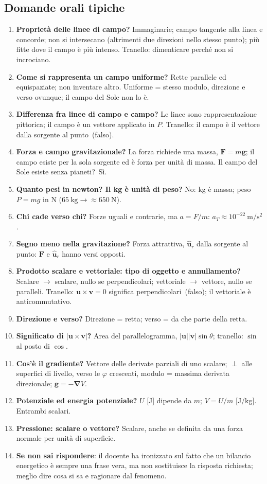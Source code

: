 \documentclass[11pt,a4paper]{article}
\newcommand{\vv}[1]{\mathbf{#1}}
\newcommand{\ur}{\hat{\mathbf{u}}_r}
\newcommand{\mo}[1]{\left|#1\right|}
\newcommand{\unit}[1]{\ \mathrm{#1}}
\newcommand{\nab}{\boldsymbol{\nabla}}
\begin{document}
\subsection{Domande orali tipiche}
\begin{enumerate}
\item \textbf{Proprietà delle linee di campo?} Immaginarie; campo tangente alla linea e concorde; non si intersecano (altrimenti due direzioni nello stesso punto); più fitte dove il campo è più intenso. Tranello: dimenticare perché non si incrociano.
\item \textbf{Come si rappresenta un campo uniforme?} Rette parallele ed equispaziate; non inventare altro. Uniforme = stesso modulo, direzione e verso ovunque; il campo del Sole non lo è.
\item \textbf{Differenza fra linee di campo e campo?} Le linee sono rappresentazione pittorica; il campo è un vettore applicato in $P$. Tranello: \guillemotleft il campo è il vettore dalla sorgente al punto\guillemotright\ (falso).
\item \textbf{Forza e campo gravitazionale?} La forza richiede una massa, $\vv F=m\vv g$; il campo esiste per la sola sorgente ed è forza per unità di massa. \guillemotleft Il campo del Sole esiste senza pianeti?\guillemotright\ Sì.
\item \textbf{Quanto pesi in newton? Il kg è unità di peso?} No: kg è massa; peso $P=mg$ in N ($65\unit{kg}\to\approx650\unit N$).
\item \textbf{Chi cade verso chi?} Forze uguali e contrarie, ma $a=F/m$: $a_T\approx10^{-22}\unit{m/s^2}$.
\item \textbf{Segno meno nella gravitazione?} Forza attrattiva, $\ur$ dalla sorgente al punto: $\vv F$ e $\ur$ hanno versi opposti.
\item \textbf{Prodotto scalare e vettoriale: tipo di oggetto e annullamento?} Scalare $\to$ scalare, nullo se perpendicolari; vettoriale $\to$ vettore, nullo se paralleli. Tranello: \guillemotleft $\vv u\times\vv v=0$ significa perpendicolari\guillemotright\ (falso); il vettoriale è anticommutativo.
\item \textbf{Direzione e verso?} Direzione = retta; verso = da che parte della retta.
\item \textbf{Significato di $\mo{\vv u\times\vv v}$?} Area del parallelogramma, $\mo{\vv u}\mo{\vv v}\sin\theta$; tranello: $\sin$ al posto di $\cos$.
\item \textbf{Cos'è il gradiente?} Vettore delle derivate parziali di uno scalare; $\perp$ alle superfici di livello, verso le $\varphi$ crescenti, modulo = massima derivata direzionale; $\vv g=-\nab V$.
\item \textbf{Potenziale ed energia potenziale?} $U$ [J] dipende da $m$; $V=U/m$ [J/kg]. Entrambi scalari.
\item \textbf{Pressione: scalare o vettore?} Scalare, anche se definita da una forza normale per unità di superficie.
\item \textbf{Se non sai rispondere}: il docente ha ironizzato sul fatto che un bilancio energetico è sempre una frase vera, ma non sostituisce la risposta richiesta; meglio dire cosa si sa e ragionare dal fenomeno.
\end{enumerate}
\end{document}
